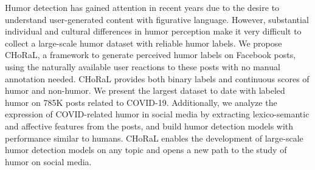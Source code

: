 Humor detection has gained attention in recent years due to the desire to understand user-generated content with figurative language. However, substantial individual and cultural differences in humor perception make it very difficult to collect a large-scale humor dataset with reliable humor labels. We propose CHoRaL, a framework to generate perceived humor labels on Facebook posts, using the naturally available user reactions to these posts with no manual annotation needed. CHoRaL provides both binary labels and continuous scores of humor and non-humor. We present the largest dataset to date with labeled humor on 785K posts related to COVID-19. Additionally, we analyze the expression of COVID-related humor in social media by extracting lexico-semantic and affective features from the posts, and build humor detection models with performance similar to humans. CHoRaL enables the development of large-scale humor detection models on any topic and opens a new path to the study of humor on social media.
